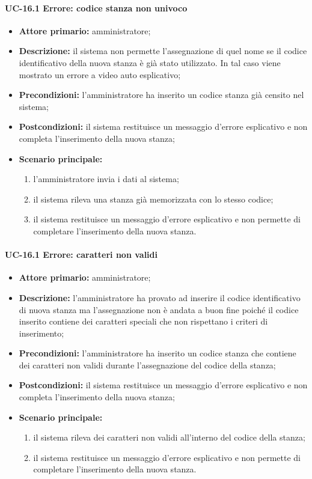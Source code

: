\paragraph{UC-16.1 Errore: codice stanza non univoco}
\begin{itemize}
	\item \textbf{Attore primario:} amministratore;
	\item \textbf{Descrizione:} il sistema non permette l'assegnazione di quel nome se il codice identificativo della nuova stanza è già stato utilizzato. In tal caso viene mostrato un errore a video auto esplicativo;
	\item \textbf{Precondizioni:} l'amministratore ha inserito un codice stanza già censito nel sistema;
	\item \textbf{Postcondizioni:} il sistema restituisce un messaggio d'errore esplicativo e non completa l'inserimento della nuova stanza;
	\item \textbf{Scenario principale:}
	      \begin{enumerate}
	      	      \item l'amministratore invia i dati al sistema;
		      \item il sistema rileva una stanza già memorizzata con lo stesso codice;
		      \item il sistema restituisce un messaggio d'errore esplicativo e non permette di completare l'inserimento della nuova stanza.
	      \end{enumerate}
\end{itemize}
    
    
\paragraph{UC-16.1 Errore: caratteri non validi}
\begin{itemize}
	\item \textbf{Attore primario:} amministratore;
	\item \textbf{Descrizione:} l'amministratore ha provato ad inserire il codice identificativo di nuova stanza ma l'assegnazione non è andata a buon fine poiché il codice inserito contiene dei caratteri speciali che non rispettano i criteri di inserimento;
	\item \textbf{Precondizioni:} l'amministratore ha inserito un codice stanza che contiene dei caratteri non validi durante l'assegnazione del codice della stanza;
	\item \textbf{Postcondizioni:} il sistema restituisce un messaggio d'errore esplicativo e non completa l'inserimento della nuova stanza;
	\item \textbf{Scenario principale:}
	      \begin{enumerate}
		      \item il sistema rileva dei caratteri non validi all'interno del codice della stanza;
		      \item il sistema restituisce un messaggio d'errore esplicativo e non permette di completare l'inserimento della nuova stanza.
	      \end{enumerate}
\end{itemize}
 
